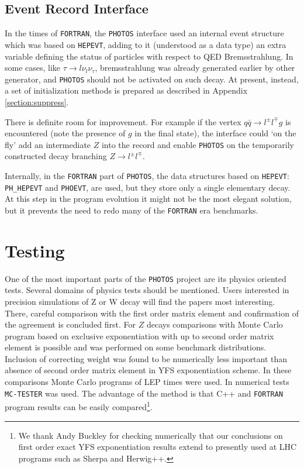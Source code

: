 \documentclass[]{Photos_interface_design}
\begin{document}
 
\subsection{Event Record Interface}
In the times of {\tt FORTRAN}, the {\tt PHOTOS} interface used an internal event structure which was
based on {\tt HEPEVT},
adding to it (understood as a data type) an extra variable defining 
the status of particles with respect to QED Bremsstrahlung. In some cases, like
$\tau \to l \nu_l \nu_\tau$, bremsstrahlung was already generated earlier
by other generator, and {\tt PHOTOS} should not be activated on such decay.
At present, instead, a set of initialization methods is 
prepared as described in Appendix \ref{section:suppress}. 

There is definite room for 
improvement. For example if the vertex $q \bar q \to l^\pm l^\mp g$ is encountered
(note the presence of $g$ in the final state),
the interface could `on the fly' add an intermediate $Z$ into the record and enable {\tt PHOTOS}
on the temporarily constructed decay branching  $Z \to l^\pm l^\mp $. 

Internally, in the {\tt FORTRAN} part of {\tt PHOTOS}, the data
structures based on {\tt HEPEVT}: {\tt PH\_HEPEVT} and {\tt PHOEVT}, 
are used, but they store only a single elementary decay. 
At this step in the program
evolution it might not be the most elegant solution, but it prevents
the need to redo many of the {\tt FORTRAN} era benchmarks.






\section{Testing}
\label{sec:tests} 
One of the most important parts of the {\tt PHOTOS} project are its physics oriented tests.
Several domains
of physics tests should be mentioned. Users interested in precision 
simulations of Z or W decay  will 
find  the papers \cite{Nanava:2009vg,Golonka:2006tw,Golonka:2005pn}
most interesting. There, careful comparison with the first order matrix element 
and confirmation of the agreement is concluded first.
For $Z$ decays comparisons  with Monte Carlo program based on exclusive 
exponentiation with up to second order matrix element
is possible and was performed on some benchmark distributions.
Inclusion of correcting weight was found to be numerically less important
than absence of second order matrix element in YFS exponentiation scheme. 
In these comparisons Monte Carlo programs of LEP times 
\cite{koralz4:1994,kkcpc:1999} were used. In numerical tests {\tt MC-TESTER} \cite{Davidson:2008ma}
was used. The advantage of the method is that C++ and {\tt FORTRAN} program
results can be easily compared\footnote{We thank Andy Buckley for checking numerically
 that our conclusions on first order exact YFS exponentiation results extend
to presently used at LHC programs such as  
Sherpa and Herwig++.  }.
 
\end{document}
